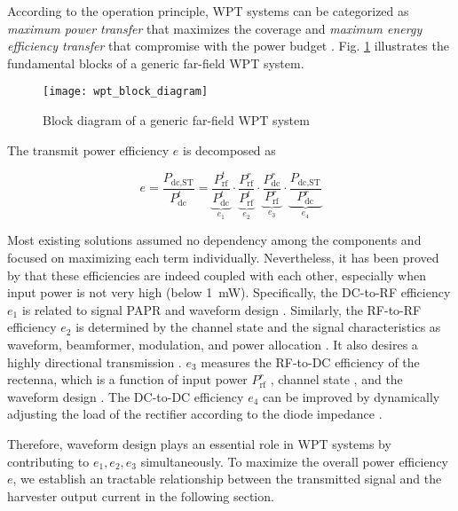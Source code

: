 According to the operation principle, WPT systems can be categorized as \textit{maximum power transfer} that maximizes the coverage and \textit{maximum energy efficiency transfer} that compromise with the power budget \cite{Hui2014}. Fig. \ref{fig:wpt-block-diagram} illustrates the fundamental blocks of a generic far-field WPT system.

\begin{figure}[ht]
  \centering
    \texttt{[image: wpt\_block\_diagram]}
  \caption{Block diagram of a generic far-field WPT system \cite{Clerckx2018a}}
  \label{fig:wpt-block-diagram}
\end{figure}

The transmit power efficiency $e$ is decomposed as

\begin{equation}\label{eqn:power_utilization_efficiency}
  e = \frac{{{P_{{\text{dc}},{\text{ST}}}}}}{{P_{{\text{dc}}}^t}} = \underbrace {\frac{{P_{{\text{rf}}}^t}}{{P_{{\text{dc}}}^t}}}_{{e_1}} \cdot \underbrace {\frac{{P_{{\text{rf}}}^r}}{{P_{{\text{rf}}}^t}}}_{{e_2}} \cdot \underbrace {\frac{{P_{{\text{dc}}}^r}}{{P_{{\text{rf}}}^r}}}_{{e_3}} \cdot \underbrace {\frac{{{P_{{\text{dc}},{\text{ST}}}}}}{{P_{{\text{dc}}}^r}}}_{{e_4}}
\end{equation}

Most existing solutions assumed no dependency among the components and focused on maximizing each term individually. Nevertheless, it has been proved by \cite{Boshkovska2015, Clerckx2016, Zeng2017} that these efficiencies are indeed coupled with each other, especially when input power is not very high (below \SI{1}{\mW}). Specifically, the DC-to-RF efficiency ${e_1}$ is related to signal PAPR and waveform design \cite{Boaventura2011}. Similarly, the RF-to-RF efficiency ${e_2}$ is determined by the channel state and the signal characteristics as waveform, beamformer, modulation, and power allocation \cite{Clerckx2019}. It also desires a highly directional transmission \cite{Takahashi2011}. ${e_3}$ measures the RF-to-DC efficiency of the rectenna, which is a function of input power ${P_{{\text{rf}}}^r}$ \cite{Trotter2009, Chen2017, Clerckx2018a}, channel state \cite{Clerckx2016, Clerckx2018}, and the waveform design \cite{Collado2014, Boaventura2015, Clerckx2019}. The DC-to-DC efficiency ${e_4}$ can be improved by dynamically adjusting the load of the rectifier according to the diode impedance \cite{Dolgov2010}.

Therefore, waveform design plays an essential role in WPT systems by contributing to ${e_1}, {e_2}, {e_3}$ simultaneously. To maximize the overall power efficiency $e$, we establish an tractable relationship between the transmitted signal and the harvester output current in the following section.